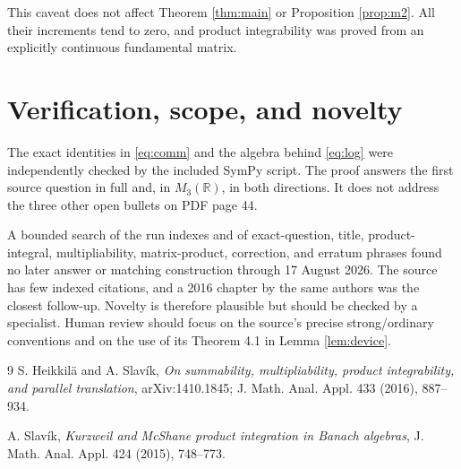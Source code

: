 \documentclass[10pt,a4paper]{article}
\newcommand{\R}{\mathbb R}
\begin{document}
This caveat does not affect Theorem \ref{thm:main} or Proposition
\ref{prop:m2}.  All their increments tend to zero, and product integrability
was proved from an explicitly continuous fundamental matrix.

\section{Verification, scope, and novelty}

The exact identities in \eqref{eq:comm} and the algebra behind
\eqref{eq:log} were independently checked by the included SymPy script.  The
proof answers the first source question in full and, in \(M_3(\R)\), in both
directions.  It does not address the three other open bullets on PDF page 44.

A bounded search of the run indexes and of exact-question, title,
product-integral, multipliability, matrix-product, correction, and erratum
phrases found no later answer or matching construction through 17 August 2026.
The source has few indexed citations, and a 2016 chapter by the same authors
was the closest follow-up.  Novelty is therefore plausible but should be
checked by a specialist.  Human review should focus on the source's precise
strong/ordinary conventions and on the use of its Theorem 4.1 in Lemma
\ref{lem:device}.

\begin{thebibliography}{9}
S. Heikkil\"a and A. Slav\'ik,
\emph{On summability, multipliability, product integrability, and parallel
translation}, arXiv:1410.1845; J. Math. Anal. Appl. 433 (2016), 887--934.

A. Slav\'ik,
\emph{Kurzweil and McShane product integration in Banach algebras},
J. Math. Anal. Appl. 424 (2015), 748--773.
\end{thebibliography}
\end{document}
